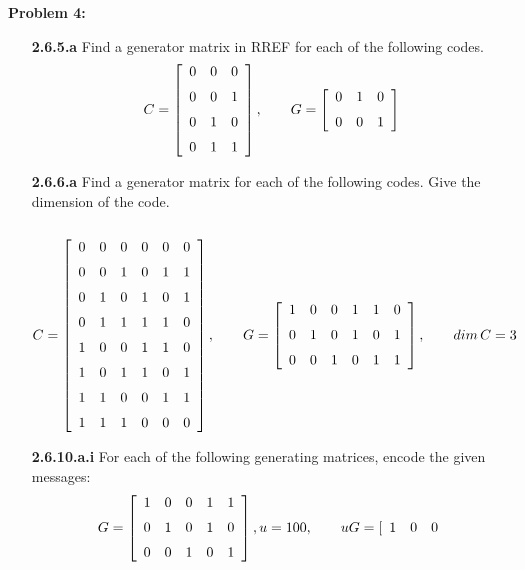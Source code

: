 \documentclass[11pt]{article}
\newenvironment{problem}[1]{\textbf{Problem #1: }}{\newpage}
\begin{document}
	\begin{problem}{4}
		\begin{itemize}
			\item[\textbf{2.6.5.a}] Find a generator matrix in RREF for each of the following codes.
			\[C =  \left[ \begin {array}{ccc} 0&0&0\\ \noalign{\medskip}0&0&1
			\\ \noalign{\medskip}0&1&0\\ \noalign{\medskip}0&1&1\end {array}
			\right], \qquad G =  \left[ \begin {array}{ccc} 0&1&0\\ \noalign{\medskip}0&0&1 \end {array}
			\right]
			\]
			\item[\textbf{2.6.6.a}] Find a generator matrix for each of the following codes. Give the dimension of the code.
			\\ \\
			\[C =  \left[ \begin {array}{cccccc} 0&0&0&0&0&0\\ \noalign{\medskip}0&0&1&0
			&1&1\\ \noalign{\medskip}0&1&0&1&0&1\\ \noalign{\medskip}0&1&1&1&1&0
			\\ \noalign{\medskip}1&0&0&1&1&0\\ \noalign{\medskip}1&0&1&1&0&1
			\\ \noalign{\medskip}1&1&0&0&1&1\\ \noalign{\medskip}1&1&1&0&0&0
			\end {array} \right], \qquad G =  \left[ \begin {array}{cccccc} 1&0&0&1&1&0\\ \noalign{\medskip}0&1&0&1
			&0&1\\ \noalign{\medskip}0&0&1&0&1&1 \end{array} \right],\qquad dim\,C = 3 \]
			\item[\textbf{2.6.10.a.i}]
			For each of the following generating matrices, encode the given messages:
			\[G = \left[ \begin{array}{ccccc}
				1&0&0&1&1 \\
				\noalign{\medskip} 0&1&0&1&0 \\
				\noalign{\medskip} 0&0&1&0&1
			\end{array}\right], u = 100, \qquad uG = [\begin{array}{ccc}
			1&0&0

\end{array}\]
\end{itemize}
\end{problem}
\end{document}
